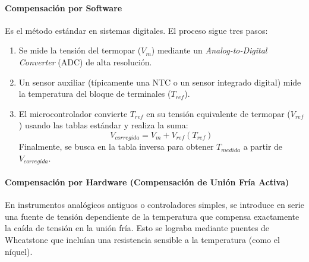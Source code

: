 \paragraph{Compensación por Software}
Es el método estándar en sistemas digitales. El proceso sigue tres pasos:
\begin{enumerate}
    \item Se mide la tensión del termopar ($V_m$) mediante un \textit{Analog-to-Digital Converter} (ADC) de alta resolución.
    \item Un sensor auxiliar (típicamente una NTC o un sensor integrado digital) mide la temperatura del bloque de terminales ($T_{ref}$).
    \item El microcontrolador convierte $T_{ref}$ en su tensión equivalente de termopar ($V_{ref}$) usando las tablas estándar y realiza la suma:
    \begin{equation}
        V_{corregida} = V_m + V_{ref}(T_{ref})
    \end{equation}
    Finalmente, se busca en la tabla inversa para obtener $T_{medida}$ a partir de $V_{corregida}$.
\end{enumerate}


\paragraph{Compensación por Hardware (Compensación de Unión Fría Activa)}
En instrumentos analógicos antiguos o controladores simples, se introduce en serie una fuente de tensión dependiente de la temperatura que compensa exactamente la caída de tensión en la unión fría. Esto se lograba mediante puentes de Wheatstone que incluían una resistencia sensible a la temperatura (como el níquel).

